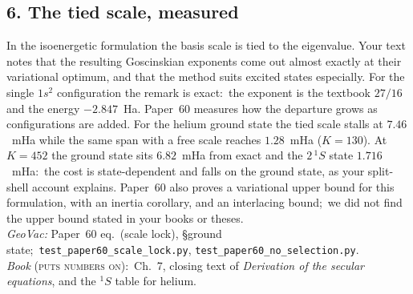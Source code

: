 \documentclass[11pt]{article}
\newcommand{\tst}[1]{\nolinkurl{#1}}
\newcommand{\rel}[1]{\textsc{#1}}
\newcommand{\bk}[1]{\textit{#1}}
\begin{document}
\subsection*{6. The tied scale, measured}
In the isoenergetic formulation the basis scale is tied to the eigenvalue.
Your text notes that the resulting Goscinskian exponents come out almost
exactly at their variational optimum, and that the method suits excited
states especially. For the single $1s^2$ configuration the remark is
exact:\ the exponent is the textbook $27/16$ and the energy $-2.847$~Ha.
Paper~60 measures how the departure grows as configurations are added. For
the helium ground state the tied scale stalls at $7.46$~mHa while the same
span with a free scale reaches $1.28$~mHa ($K=130$). At $K=452$ the ground
state sits $6.82$~mHa from exact and the $2\,^1S$ state $1.716$~mHa:\ the
cost is state-dependent and falls on the ground state, as your split-shell
account explains. Paper~60 also proves a variational upper bound for this
formulation, with an inertia corollary, and an interlacing bound;\ we did
not find the upper bound stated in your books or theses.\\
\emph{GeoVac:} Paper~60 eq.~(scale lock), \S ground state;\
\tst{test_paper60_scale_lock.py}, \tst{test_paper60_no_selection.py}.\\
\emph{Book} (\rel{puts numbers on}):\ Ch.~7, closing text of
\bk{Derivation of the secular equations}, and the $^1S$ table for helium.
\end{document}
